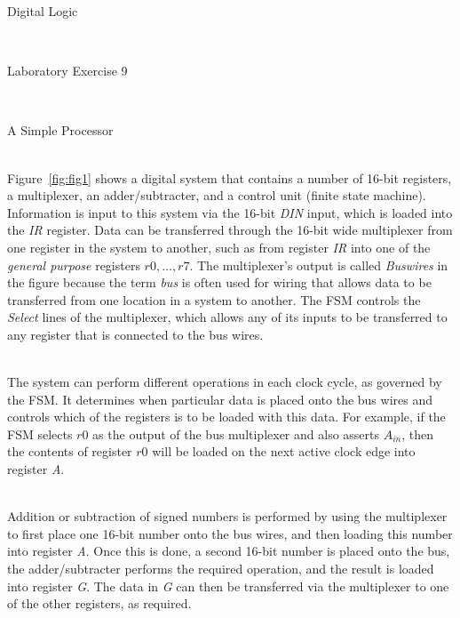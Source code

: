 \documentclass[epsfig,10pt,fullpage]{article}
\newcommand{\LabNum}{9}
\begin{document}
\centerline{\huge Digital Logic}
~\\
\centerline{\huge Laboratory Exercise \LabNum}
~\\
\centerline{\large A Simple Processor}
~\\

Figure~\ref{fig:fig1} shows a digital system that contains a number of 16-bit registers,
a multiplexer, an adder/subtracter, and a control unit (finite state machine).  Information
is input to this system via the 16-bit {\it DIN} input, which is loaded into the {\it IR} 
register. Data can be transferred through the 16-bit wide multiplexer from one register
in the system to another, such as from register {\it IR} into one of the {\it general 
purpose} registers $r0, \ldots, r7$.  The multiplexer's output is called {\it Buswires} 
in the figure because the term {\it bus} is often used for wiring that allows data to be 
transferred from one location in a system to another. The FSM controls the {\it Select} 
lines of the multiplexer, which allows any of its inputs to be transferred to any register
that is connected to the bus wires.

~\\
The system can perform different operations in each clock cycle, as governed by the FSM. 
It determines when particular data is placed onto the bus wires and controls which of the 
registers is to be loaded with this data. For example, if the FSM selects $r0$ as the output of the 
bus multiplexer and also asserts $A_{in}$, then the contents of register $r0$ will be loaded on the 
next active clock edge into register {\it A}.

~\\
Addition or subtraction of signed numbers is performed by using the multiplexer to first 
place one 16-bit number onto the bus wires, and then loading this number into register {\it A}. 
Once this is done, a second 16-bit number is placed onto the bus, the adder/subtracter
performs the required operation, and the result is loaded into register {\it G}. The
data in {\it G} can then be transferred via the multiplexer to one of the other registers,
as required.
\end{document}
